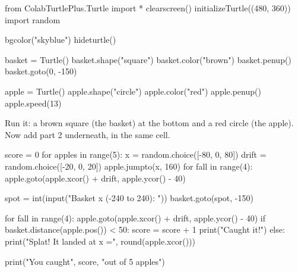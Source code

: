 \begin{typethis}
from ColabTurtlePlus.Turtle import *
clearscreen()
initializeTurtle((480, 360))
import random

bgcolor("skyblue")
hideturtle()

basket = Turtle()
basket.shape("square")
basket.color("brown")
basket.penup()
basket.goto(0, -150)

apple = Turtle()
apple.shape("circle")
apple.color("red")
apple.penup()
apple.speed(13)
\end{typethis}

Run it: a brown square (the basket) at the bottom and a red circle (the apple). Now add part 2 underneath, in the same cell.

\lstset{firstnumber=21}
\begin{typethis}
score = 0
for apples in range(5):
    x = random.choice([-80, 0, 80])
    drift = random.choice([-20, 0, 20])
    apple.jumpto(x, 160)
    for fall in range(4):
        apple.goto(apple.xcor() + drift,
                   apple.ycor() - 40)

    spot = int(input("Basket x (-240 to 240): "))
    basket.goto(spot, -150)

    for fall in range(4):
        apple.goto(apple.xcor() + drift,
                   apple.ycor() - 40)
    if basket.distance(apple.pos()) < 50:
        score = score + 1
        print("Caught it!")
    else:
        print("Splat! It landed at x =",
              round(apple.xcor()))

print("You caught", score, "out of 5 apples")
\end{typethis}
\lstset{firstnumber=1}

